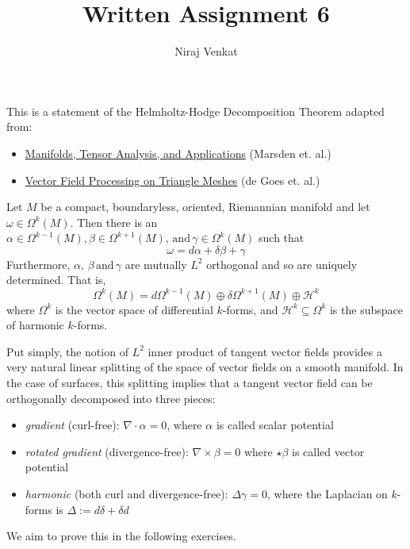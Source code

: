 \documentclass{article}
\def\grad{\nabla}
\def\lap{\Delta}
\def\cH{\mathcal{H}}
\begin{document}
\title{Written Assignment 6}

\author{Niraj Venkat}

\date{}

\maketitle

\vspace{.8cm}

This is a statement of the Helmholtz-Hodge Decomposition Theorem adapted from:
\begin{itemize}
    \item \href{https://brickisland.net/DDGSpring2021/2021/03/18/book-recommendation-for-differential-forms/}{Manifolds, Tensor Analysis, and Applications}
    (Marsden et. al.)
    \item \href{https://dl.acm.org/doi/10.1145/2818143.2818167}{Vector Field Processing on Triangle Meshes}
    (de Goes et. al.)
\end{itemize}

\begin{mdframed}
    Let $M$ be a compact, boundaryless, oriented, Riemannian manifold and let $\omega \in \Omega^k(M)$.
    Then there is an $\alpha \in \Omega^{k-1}(M), \beta \in \Omega^{k+1}(M), \,\text{and}\, \gamma \in \Omega^k(M)$ such that
    $$\omega = d\alpha + \delta\beta + \gamma$$
    Furthermore, $\alpha, \,\beta \,\text{and}\, \gamma$ are mutually $L^2$ orthogonal
    and so are uniquely determined. That is,
    $$\Omega^k(M) = d\Omega^{k-1}(M) \oplus \delta\Omega^{k+1}(M) \oplus \cH^k$$
    where $\Omega^k$ is the vector space of differential $k$-forms, and $\cH^k \subseteq \Omega^k$ is the subspace of harmonic $k$-forms.
\end{mdframed}

Put simply, the notion of $L^2$ inner product of tangent vector fields provides a very natural linear splitting 
of the space of vector fields on a smooth manifold. In the case of surfaces, this splitting implies that a 
tangent vector field can be orthogonally decomposed into three pieces:
\begin{itemize}
    \item \emph{gradient} (curl-free): $\grad \cdot \alpha = 0$, where $\alpha$ is called scalar potential
    \item \emph{rotated gradient} (divergence-free): $\grad \times \beta = 0$ where $\star\beta$ is called vector potential
    \item \emph{harmonic} (both curl and divergence-free): $\lap \gamma = 0$, where the Laplacian on $k$-forms is
    $\lap := d\delta + \delta d$
\end{itemize}
We aim to prove this in the following exercises.
\end{document}
